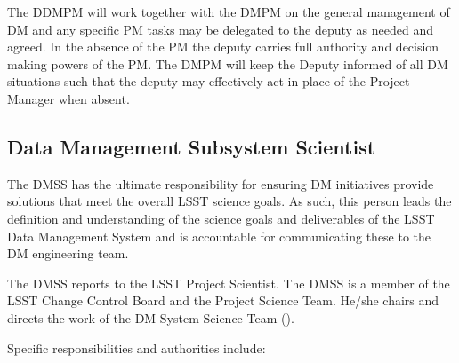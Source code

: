 The \gls{DDMPM} will work together with the \gls{DMPM} on the general management of DM and any specific PM tasks may be delegated to the deputy as needed and agreed. In the absence of the PM the deputy carries full authority and decision making powers of the PM.
The \gls{DMPM} will keep the Deputy informed of all DM situations such that the deputy may effectively act in place of the Project Manager when absent.

\subsection{Data Management Subsystem Scientist} \label{role:dmps}

The \gls{DMSS} has the ultimate responsibility for ensuring DM initiatives provide solutions that meet the overall \gls{LSST} science goals.
As such, this person leads the definition and understanding of the science goals and deliverables of the \gls{LSST} \gls{Data Management} System and is accountable for communicating these to the DM engineering team.

The \gls{DMSS} reports to the \gls{LSST} \gls{Project Scientist}.
The \gls{DMSS} is a member of the \gls{LSST} \gls{Change Control Board} and the \gls{Project Science Team}.
He/she chairs and directs the work of the DM System Science Team ().

Specific responsibilities and authorities include:


